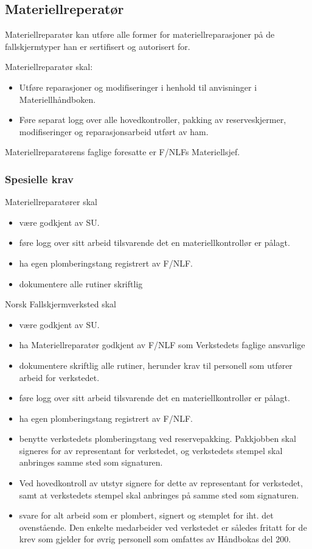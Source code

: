 \subsection{Materiellreperatør}
Materiellreparatør kan utføre alle former for materiellreparasjoner på de fallskjermtyper han er sertifisert og autorisert for.

Materiellreparatør skal:
\begin{itemize}
	\item Utføre reparasjoner og modifiseringer i henhold til anvisninger i Materiellhåndboken.
	\item Føre separat logg over alle hovedkontroller, pakking av reserveskjermer, modifiseringer og reparasjonsarbeid utført av ham.
\end{itemize}

Materiellreparatørens faglige foresatte er F/NLFs Materiellsjef.

\subsubsection{Spesielle krav}
Materiellreparatører skal
\begin{itemize}
	\item være godkjent av SU.
	\item føre logg over sitt arbeid tilsvarende det en materiellkontrollør er pålagt.
	\item ha egen plomberingstang registrert av F/NLF.
	\item dokumentere alle rutiner skriftlig
\end{itemize}

Norsk Fallskjermverksted skal
\begin{itemize}
	\item være godkjent av SU.
	\item ha Materiellreparatør godkjent av F/NLF som Verkstedets faglige ansvarlige
	\item dokumentere skriftlig alle rutiner, herunder krav til personell som utfører arbeid for verkstedet.
	\item føre logg over sitt arbeid tilsvarende det en materiellkontrollør er pålagt.
	\item ha egen plomberingstang registrert av F/NLF.
	\item benytte verkstedets plomberingstang ved reservepakking. Pakkjobben skal signeres for av representant for verkstedet, og verkstedets stempel skal anbringes samme sted som signaturen.
	\item Ved hovedkontroll av utstyr signere for dette av representant for verkstedet, samt at verkstedets stempel skal anbringes på samme sted som signaturen.
	\item svare for alt arbeid som er plombert, signert og stemplet for iht. det ovenstående. Den enkelte medarbeider ved verkstedet er således fritatt for de krev som gjelder for øvrig personell som omfattes av Håndbokas del 200.
\end{itemize}

